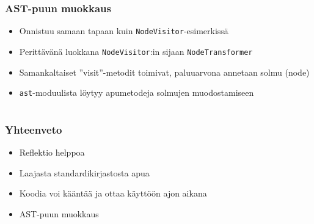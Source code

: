 \documentclass{beamer}
\begin{document}
\begin{frame}[fragile]
\frametitle{AST-puun muokkaus}
\begin{itemize}
\item{Onnistuu samaan tapaan kuin \verb|NodeVisitor|-esimerkissä}
\item{Perittävänä luokkana \verb|NodeVisitor|:in sijaan \verb|NodeTransformer|}
\item{Samankaltaiset ''visit''-metodit toimivat, paluuarvona annetaan solmu (node)}
\item{\verb|ast|-moduulista löytyy apumetodeja solmujen muodostamiseen}
\end{itemize}
\end{frame}


\section{}

\begin{frame}[fragile]
  \frametitle{Yhteenveto}
\begin{itemize}
\item{Reflektio helppoa}
\item{Laajasta standardikirjastosta apua}
\item{Koodia voi kääntää ja ottaa käyttöön ajon aikana}
\item{AST-puun muokkaus}
\end{itemize}
\end{frame}
\end{document}
